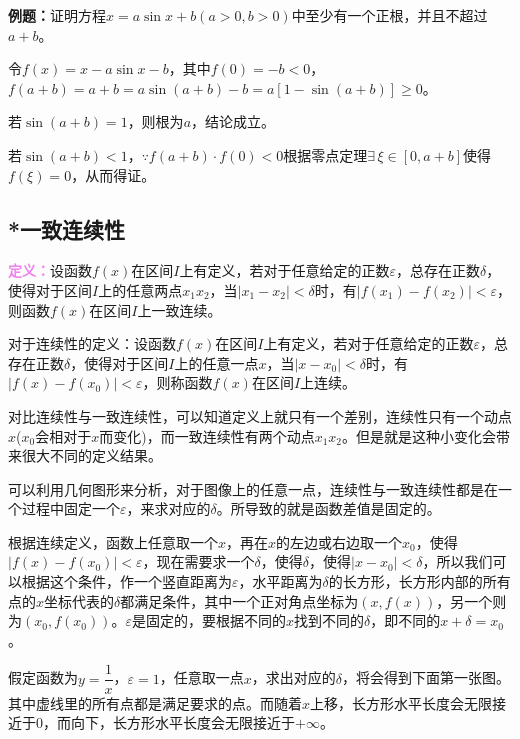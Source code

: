 \documentclass[UTF8, 12pt]{ctexart}
\begin{document}
\textbf{例题：}证明方程$x=a\sin x+b(a>0,b>0)$中至少有一个正根，并且不超过$a+b$。

令$f(x)=x-a\sin x-b$，其中$f(0)=-b<0$，$f(a+b)=a+b=a\sin(a+b)-b=a[1-\sin(a+b)]\geqslant 0$。

若$\sin(a+b)=1$，则根为$a$，结论成立。

若$\sin(a+b)<1$，$\because f(a+b)\cdot f(0)<0$根据零点定理$\exists\,\xi\in[0,a+b]$使得$f(\xi)=0$，从而得证。

\subsection{*一致连续性}

\textcolor{violet}{\textbf{定义：}}设函数$f(x)$在区间$I$上有定义，若对于任意给定的正数$\varepsilon$，总存在正数$\delta$，使得对于区间$I$上的任意两点$x_1x_2$，当$\vert x_1-x_2\vert<\delta$时，有$\vert f(x_1)-f(x_2)\vert<\varepsilon$，则函数$f(x)$在区间$I$上一致连续。

对于连续性的定义：设函数$f(x)$在区间$I$上有定义，若对于任意给定的正数$\varepsilon$，总存在正数$\delta$，使得对于区间$I$上的任意一点$x$，当$\vert x-x_0\vert<\delta$时，有$\vert f(x)-f(x_0)\vert<\varepsilon$，则称函数$f(x)$在区间$I$上连续。

对比连续性与一致连续性，可以知道定义上就只有一个差别，连续性只有一个动点$x$($x_0$会相对于$x$而变化)，而一致连续性有两个动点$x_1x_2$。但是就是这种小变化会带来很大不同的定义结果。

可以利用几何图形来分析，对于图像上的任意一点，连续性与一致连续性都是在一个过程中固定一个$\varepsilon$，来求对应的$\delta$。所导致的就是函数差值是固定的。

根据连续定义，函数上任意取一个$x$，再在$x$的左边或右边取一个$x_0$，使得$\vert f(x)-f(x_0)\vert<\varepsilon$，现在需要求一个$\delta$，使得$\delta$，使得$\vert x-x_0\vert<\delta$，所以我们可以根据这个条件，作一个竖直距离为$\varepsilon$，水平距离为$\delta$的长方形，长方形内部的所有点的$x$坐标代表的$\delta$都满足条件，其中一个正对角点坐标为$(x,f(x))$，另一个则为$(x_0,f(x_0))$。$\varepsilon$是固定的，要根据不同的$x$找到不同的$\delta$，即不同的$x+\delta=x_0$。

假定函数为$y=\dfrac{1}{x}$，$\varepsilon=1$，任意取一点$x$，求出对应的$\delta$，将会得到下面第一张图。其中虚线里的所有点都是满足要求的点。而随着$x$上移，长方形水平长度会无限接近于0，而向下，长方形水平长度会无限接近于$+\infty$。
\end{document}
